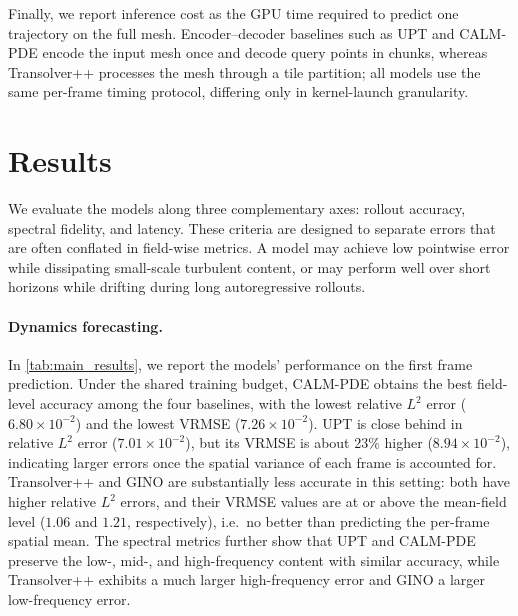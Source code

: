 \documentclass{article}
\begin{document}
Finally, we report \textcolor{revcolor}{inference cost as the GPU time required to predict one trajectory on the full mesh.} Encoder--decoder baselines such as UPT and CALM-PDE encode the input mesh once and decode query points in chunks, whereas Transolver\textcolor{revcolor}{++} processes the mesh through a tile partition; all models use the same per-frame timing protocol, differing only in kernel-launch granularity. 


\section{Results}
\label{sec:results}

We evaluate the models along three complementary axes: rollout accuracy, spectral fidelity, and latency. These criteria are designed to separate errors that are often conflated in field-wise metrics. A model may achieve low pointwise error while dissipating small-scale turbulent content, or may perform well over short horizons while drifting during long autoregressive rollouts.

\paragraph{Dynamics forecasting.}
In \autoref{tab:main_results}, we report the models' performance on the first frame prediction. \textcolor{revcolor}{Under the shared training budget, CALM-PDE obtains the best field-level accuracy among the four baselines}, with the lowest relative $L^2$ error ($6.80\times 10^{-2}$) and the lowest VRMSE ($7.26\times 10^{-2}$). UPT is close behind in relative $L^2$ error ($7.01\times 10^{-2}$), but its VRMSE is about 23\% higher ($8.94\times 10^{-2}$), indicating larger errors once the spatial variance of each frame is accounted for. Transolver++ and GINO are substantially less accurate in this setting: both have higher relative $L^2$ errors, and their VRMSE values are at or above the mean-field level ($1.06$ and $1.21$, respectively), i.e.\ no better than predicting the per-frame spatial mean. The spectral metrics further show that UPT and CALM-PDE preserve the low-, mid-, and high-frequency content with similar accuracy, while Transolver++ exhibits a much larger high-frequency error and GINO a larger low-frequency error.
\end{document}
